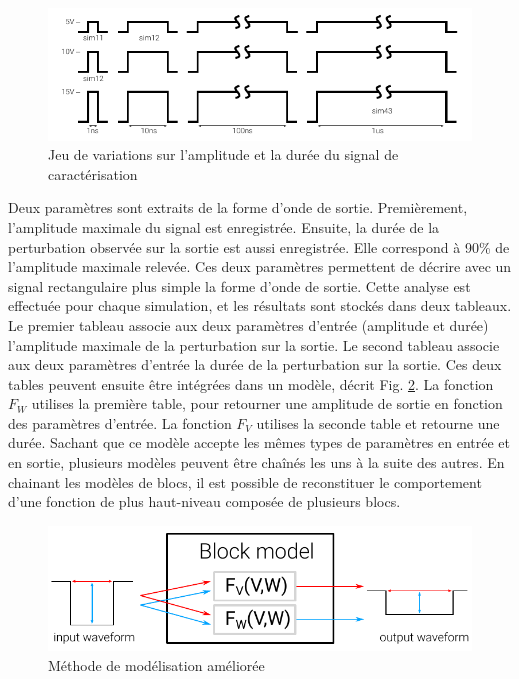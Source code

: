 \begin{figure}[!h]
  \centering
  \includegraphics{src/1/figures/time_domain_cz_curves.pdf}
  \caption{Jeu de variations sur l'amplitude et la durée du signal de caractérisation}
  \label{set_input_signals}
\end{figure}

Deux paramètres sont extraits de la forme d'onde de sortie.
Premièrement, l'amplitude maximale du signal est enregistrée.
Ensuite, la durée de la perturbation observée sur la sortie est aussi enregistrée.
Elle correspond à 90\% de l'amplitude maximale relevée.
Ces deux paramètres permettent de décrire avec un signal rectangulaire plus simple la forme d'onde de sortie.
Cette analyse est effectuée pour chaque simulation, et les résultats sont stockés dans deux tableaux.
Le premier tableau associe aux deux paramètres d'entrée (amplitude et durée) l'amplitude maximale de la perturbation sur la sortie.
Le second tableau associe aux deux paramètres d'entrée la durée de la perturbation sur la sortie.
Ces deux tables peuvent ensuite être intégrées dans un modèle, décrit Fig. \ref{fig:principle-transfert-func-v2}.
La fonction $F_{W}$ utilises la première table, pour retourner une amplitude de sortie en fonction des paramètres d'entrée.
La fonction $F_{V}$ utilises la seconde table et retourne une durée.
Sachant que ce modèle accepte les mêmes types de paramètres en entrée et en sortie, plusieurs modèles peuvent être chaînés les uns à la suite des autres.
En chainant les modèles de blocs, il est possible de reconstituer le comportement d'une fonction de plus haut-niveau composée de plusieurs blocs.

\begin{figure}[!h]
  \centering
  \includegraphics{src/1/figures/principle_transfert_function_v2.pdf}
  \caption{Méthode de modélisation améliorée}
  \label{fig:principle-transfert-func-v2}
\end{figure}

